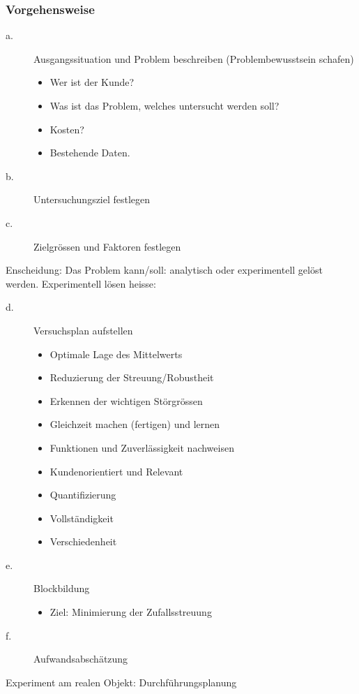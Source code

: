 \subsubsection{Vorgehensweise}

\begin{description}
\item[a.] Ausgangssituation und Problem beschreiben (Problembewusstsein schafen)
	\begin{itemize}
		\item Wer ist der Kunde?
		\item Was ist das Problem, welches untersucht werden soll?
		\item Kosten?
		\item Bestehende Daten.
	\end{itemize}
\item[b.] Untersuchungsziel festlegen
\item[c.] Zielgrössen und Faktoren festlegen
\end{description}

Enscheidung: Das Problem kann/soll:
analytisch oder experimentell gelöst werden. Experimentell lösen heisse:
\begin{description}
\item[d.] Versuchsplan aufstellen
	\begin{itemize}
			\item Optimale Lage des Mittelwerts
			\item Reduzierung der Streuung/Robustheit
			\item Erkennen der wichtigen Störgrössen
			\item Gleichzeit machen (fertigen) und lernen
			\item Funktionen und Zuverlässigkeit nachweisen
		\end{itemize}
		\begin{itemize}
			\item Kundenorientiert und Relevant
			\item Quantifizierung
			\item Vollständigkeit
			\item Verschiedenheit
		\end{itemize}
\item[e.] Blockbildung \begin{itemize}
			\item Ziel: Minimierung der Zufallsstreuung
		\end{itemize}
\item[f.] Aufwandsabschätzung
\end{description}
Experiment am realen Objekt: Durchführungsplanung

